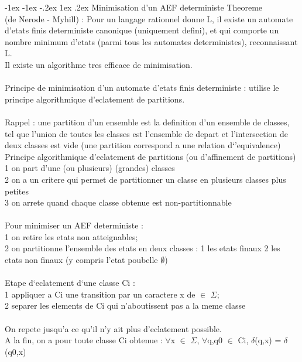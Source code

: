 \documentclass[5pt]{article}
\makeatletter
\renewcommand{\subsubsection}{\@startsection {section}{1}{\z@}%
             {-1ex \@plus -1ex \@minus -.2ex}%
             {1ex \@plus.2ex}%
             {\normalfont\scriptsize\sffamily\bfseries}}
\makeatother
\begin{document}
\begin{scriptsize}
\subsubsection{Minimisation d'un AEF deterministe}
Theoreme\\
(de Nerode - Myhill) : Pour un langage rationnel donne L, il existe un automate d’etats finis deterministe canonique (uniquement defini), et qui comporte un nombre minimum d’etats (parmi tous les automates deterministes), reconnaissant L.\\
Il existe un algorithme tres efficace de minimisation.\\
\\
Principe de minimisation d’un automate d’etats finis deterministe : utilise le principe algorithmique d’eclatement de partitions.\\
\\
Rappel : une partition d’un ensemble est la definition d’un ensemble de classes, tel que l’union de toutes les classes est l’ensemble de depart et l’intersection de deux classes est vide (une partition correspond a une relation d‘’equivalence)\\
Principe algorithmique d’eclatement de partitions (ou d’affinement de partitions)\\
1 on part d’une (ou plusieurs) (grandes) classes\\
2 on a un critere qui permet de partitionner un classe en plusieurs classes plus petites\\
3 on arrete quand chaque classe obtenue est non-partitionnable\\
\\
Pour minimiser un AEF deterministe :\\
1 on retire les etats non atteignables;\\
2 on partitionne l’ensemble des etats en deux classes : 1 les etats finaux 2 les etats non finaux (y compris l’etat poubelle $\emptyset$)\\
\\
Etape d‘eclatement d‘une classe Ci :\\
1 appliquer a Ci une transition par un caractere x de $\in$ $\Sigma$;\\
2 separer les elements de Ci qui n’aboutissent pas a la meme classe\\
\\
On repete jusqu’a ce qu’il n’y ait plus d’eclatement possible.\\
A la fin, on a pour toute classe Ci obtenue : $\forall$x $\in$ $\Sigma$, $\forall$q,q0 $\in$ Ci, $\delta$(q,x) = $\delta$(q0,x)\\

\end{scriptsize}
\end{document}
